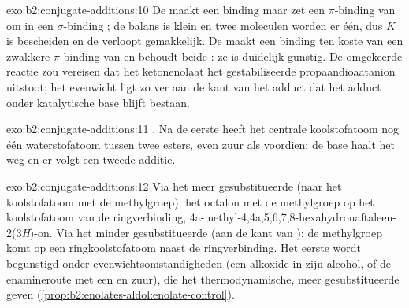 \begin{solution}{exo:b2:conjugate-additions:10}
De  maakt een binding  maar zet een $\pi$-binding van  om in een $\sigma$-binding ; de
balans is klein en twee moleculen worden er één, dus $K$ is bescheiden en de  verloopt gemakkelijk. De
 maakt een binding  ten koste van een zwakkere $\pi$-binding van  en behoudt beide
: ze is duidelijk gunstig. De omgekeerde reactie zou vereisen dat het ketonenolaat het gestabiliseerde propaandioaatanion uitstoot; het
evenwicht ligt zo ver aan de kant van het adduct dat het adduct onder katalytische base blijft bestaan.
\end{solution}

\begin{solution}{exo:b2:conjugate-additions:11}
. Na de eerste  heeft het centrale koolstofatoom nog één
waterstofatoom tussen twee esters, even zuur als voordien: de base haalt het weg en er volgt een tweede additie.
\end{solution}

\begin{solution}{exo:b2:conjugate-additions:12}
Via het meer gesubstitueerde  (naar het koolstofatoom met de methylgroep): het octalon met de methylgroep
op het koolstofatoom van de ringverbinding, 4a-methyl-4,4a,5,6,7,8-hexahydronaftaleen-2(3\textit{H})-on. Via
het minder gesubstitueerde  (aan de kant van ): de methylgroep komt op een ringkoolstofatoom naast de
ringverbinding. Het eerste wordt begunstigd onder evenwichtsomstandigheden (een alkoxide in zijn alcohol, of de enamineroute
met een  en zuur), die het thermodynamische, meer gesubstitueerde  geven
(\cref{prop:b2:enolates-aldol:enolate-control}).
\end{solution}

